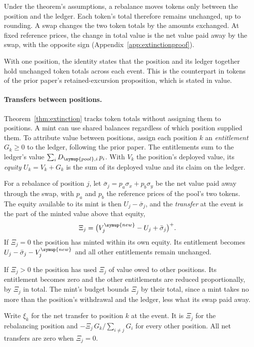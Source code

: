 \documentclass[11pt,a4paper]{article}
\theoremstyle{siphon}
\begin{document}
\noindent Under the theorem's assumptions, a rebalance moves tokens only between the position and the ledger. Each token's total therefore remains unchanged, up to rounding. A swap changes the two token totals by the amounts exchanged. At fixed reference prices, the change in total value is the net value paid away by the swap, with the opposite sign (Appendix~\ref{app:extinctionproof}).

With one position, the identity states that the position and its ledger together hold unchanged token totals across each event. This is the counterpart in tokens of the prior paper's retained-excursion proposition, which is stated in value.

\paragraph{Transfers between positions.}\label{rem:partition}
Theorem~\ref{thm:extinction} tracks token totals without assigning them to positions. A mint can use shared balances regardless of which position supplied them. To attribute value between positions, assign each position $k$ an \emph{entitlement} $G_k \geq 0$ to the ledger, following the prior paper\cite{ryan2026siphon}. The entitlements sum to the ledger's value $\sum_i D_{\symup{pool},i}\,p_i$. With $V_k$ the position's deployed value, its \emph{equity} $U_k = V_k + G_k$ is the sum of its deployed value and its claim on the ledger.

For a rebalance of position $j$, let $\bar\sigma_j = p_a\sigma_x + p_b\sigma_y$ be the net value paid away through the swap, with $p_a$ and $p_b$ the reference prices of the pool's two tokens. The equity available to its mint is then $U_j - \bar\sigma_j$, and the \emph{transfer} at the event is the part of the minted value above that equity,
\[
\Xi_j = \bigl(V_j^{\symup{new}} - U_j + \bar\sigma_j\bigr)^{+}.
\]
If $\Xi_j = 0$ the position has minted within its own equity. Its entitlement becomes $U_j - \bar\sigma_j - V_j^{\symup{new}}$ and all other entitlements remain unchanged.

If $\Xi_j > 0$ the position has used $\Xi_j$ of value owed to other positions. Its entitlement becomes zero and the other entitlements are reduced proportionally, by $\Xi_j$ in total. The mint's budget bounds $\Xi_j$ by their total, since a mint takes no more than the position's withdrawal and the ledger, less what its swap paid away.

Write $\xi_k$ for the net transfer to position $k$ at the event. It is $\Xi_j$ for the rebalancing position and $-\Xi_j\,G_k/\sum_{i \neq j} G_i$ for every other position. All net transfers are zero when $\Xi_j = 0$.
\end{document}
